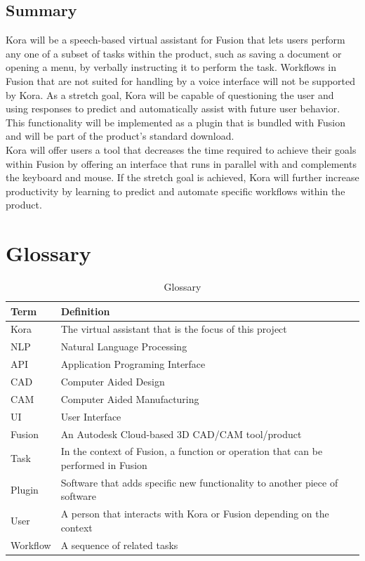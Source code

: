 \documentclass[onecolumn, draftclsnofoot,10pt, compsoc]{IEEEtran}
\def \botname{Kora\xspace}
\begin{document}
	
	\subsection{Summary}
		\botname will be a speech-based virtual assistant for Fusion that lets users perform any one of a subset of tasks within the product, such as saving a document or opening a menu, by verbally instructing it to perform the task.
		Workflows in Fusion that are not suited for handling by a voice interface will not be supported by \botname.
		As a stretch goal, \botname will be capable of questioning the user and using responses to predict and automatically assist with future user behavior.
		This functionality will be implemented as a plugin that is bundled with Fusion and will be part of the product's standard download. 
        \\[0.1in]		
		\botname will offer users a tool that decreases the time required to achieve their goals within Fusion by offering an interface that runs in parallel with and complements the keyboard and mouse.
		If the stretch goal is achieved, \botname will further increase productivity by learning to predict and automate specific workflows within the product.

\section{Glossary}
	\begin{table}[H]
		\centering
		\caption{Glossary}
		\label{my-label}
		\begin{tabular}{|l|l|}
			\hline
			\textbf{Term} & \textbf{Definition} \\ \hline
			\botname & The virtual assistant that is the focus of this project \\ \hline
			NLP & Natural Language Processing \\ \hline
			API & Application Programing Interface \\ \hline
			CAD & Computer Aided Design \\ \hline
			CAM & Computer Aided Manufacturing \\ \hline
            UI & User Interface \\ \hline
			Fusion & An Autodesk Cloud-based 3D CAD/CAM tool/product \\ \hline
			Task & In the context of Fusion, a function or operation that can be performed in Fusion \\ \hline
			Plugin & Software that adds specific new functionality to another piece of software \\ \hline
			User & A person that interacts with \botname or Fusion depending on the context \\ \hline
			Workflow & A sequence of related tasks \\ \hline
		\end{tabular}
	\end{table}
\end{document}

